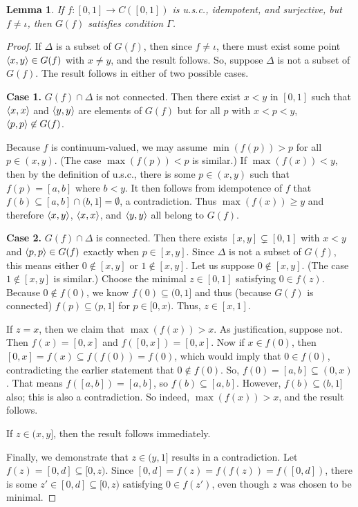 \documentclass{amsart}
\newtheorem{lemma}[theorem]{Lemma}
\theoremstyle{definition}
\begin{document}
\begin{lemma} \label{big lemma}
If $f: [0,1] \rightarrow C([0,1])$ is u.s.c., idempotent, and surjective, but $f \not=\iota$, then $G(f)$ satisfies condition $\Gamma$.
\end{lemma}

\begin{proof}
If $\Delta$ is a subset of $G(f)$, then since $f \not=\iota$, there must exist some point $\langle x,y\rangle \in G(f)$ with $x \not= y$, and the result follows. So, suppose $\Delta$ is not a subset of $G(f)$. The result follows in either of two possible cases.

\textbf{Case 1.} $G(f) \cap \Delta$ is not connected. Then there exist $x<y$ in $[0,1]$ such that $\langle x,x\rangle$ and $\langle y,y\rangle$ are elements of $G(f)$ but for all $p$ with $x < p < y$, $\langle p, p \rangle \not\in G(f)$.

Because $f$ is continuum-valued, we may assume $\min(f(p))>p$ for all $p\in(x,y)$. (The case $\max(f(p))<p$ is similar.) If $\max(f(x))<y$, then by the definition of u.s.c., there is some $p\in(x,y)$ such that $f(p)=[a,b]$ where $b<y$. It then follows from idempotence of $f$ that $f(b)\subseteq [a,b]\cap(b,1]=\emptyset$, a contradiction. Thus $\max(f(x))\geq y$ and therefore $\langle x,y\rangle$, $\langle x,x\rangle$, and $\langle y,y\rangle$ all belong to $G(f)$.

\textbf{Case 2.} $G(f) \cap \Delta$ is connected. Then there exists $[x,y]\subsetneq[0,1]$ with $x<y$ and $\langle p,p\rangle\in G(f)$ exactly when $p\in[x,y]$. Since $\Delta$ is not a subset of $G(f)$, this means either $0 \not\in [x,y]$ or $1 \not\in [x,y]$. Let us suppose $0\not\in[x,y]$. (The case $1\not\in[x,y]$ is similar.) Choose the minimal $z\in[0,1]$ satisfying $0\in f(z)$. Because $0 \not\in f(0)$, we know $f(0) \subseteq (0,1]$ and thus (because $G(f)$ is connected) $f(p) \subseteq (p,1]$ for $p \in [0,x)$. Thus, $z \in [x,1]$.

If $z=x$, then we claim that $\max(f(x))>x$. As justification, suppose not. Then $f(x) = [0,x]$ and $f([0,x]) = [0,x]$. Now if $x \in f(0)$, then $[0,x] = f(x) \subseteq f(f(0)) = f(0)$, which would imply that $0 \in f(0)$, contradicting the earlier statement that $0 \not\in f(0)$. So, $f(0) = [a,b] \subseteq (0,x)$. That means $f([a,b]) = [a,b]$, so $f(b) \subseteq [a,b]$. However, $f(b) \subseteq (b,1]$ also; this is also a contradiction. So indeed, $\max(f(x))>x$, and the result follows.

If $z\in(x,y]$, then the result follows immediately.

Finally, we demonstrate that $z\in(y,1]$ results in a contradiction. Let $f(z)=[0,d]\subseteq[0,z)$. Since $[0,d]=f(z)=f(f(z))=f([0,d])$, there is some $z'\in[0,d]\subseteq[0,z)$ satisfying $0\in f(z')$, even though $z$ was chosen to be minimal.
\end{proof}
\end{document}
